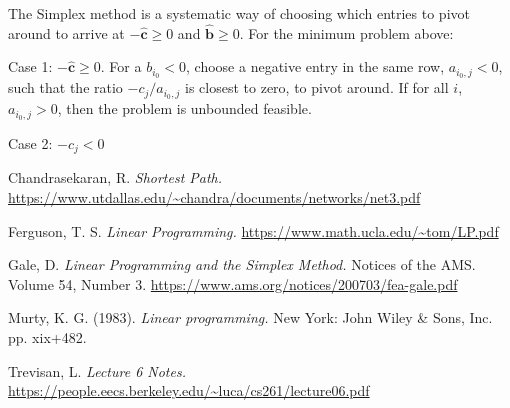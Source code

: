 \documentclass[12pt]{article}
\begin{document}
The Simplex method is a systematic way of choosing which entries to pivot around to arrive at $-\mathbf{\hat{c}}\geq0$ and $\mathbf{\hat{b}}\geq0$. For the minimum problem above:

Case 1: $-\mathbf{\hat{c}} \geq 0$. For a $b_{i_0} < 0$, choose a negative entry in the same row, $a_{i_0,j} < 0$, such that the ratio $-c_j/a_{i_0,j}$ is closest to zero, to pivot around. If for all $i$, $a_{i_0,j} > 0$, then the problem is unbounded feasible.

Case 2: $-\hat{c}_j < 0$ 

\begin{thebibliography}{9}

Chandrasekaran, R. 
\textit{Shortest Path.} 
\url{https://www.utdallas.edu/~chandra/documents/networks/net3.pdf}

Ferguson, T. S.
\textit{Linear Programming.}
\url{https://www.math.ucla.edu/~tom/LP.pdf}

Gale, D.
\textit{Linear Programming and the Simplex Method.}
Notices of the AMS. 
Volume 54, Number 3.
\url{https://www.ams.org/notices/200703/fea-gale.pdf}

Murty, K. G. (1983). 
\textit{Linear programming.} 
New York: John Wiley \& Sons, Inc. pp. xix+482.

Trevisan, L.
\textit{Lecture 6 Notes.}
\url{https://people.eecs.berkeley.edu/~luca/cs261/lecture06.pdf}

\end{thebibliography}
\end{document}
